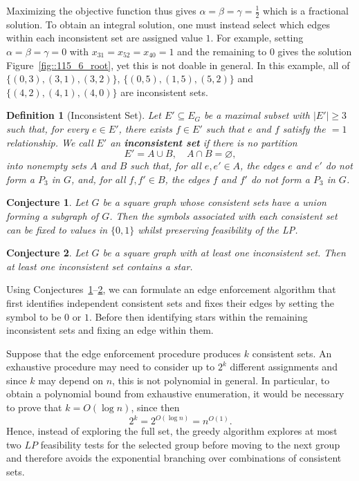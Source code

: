 \documentclass[11pt]{report}
\newtheorem{conjecture}{Conjecture}
\newtheorem{definition}{Definition}[section]
\begin{document}
Maximizing the objective function thus gives $\displaystyle \alpha=\beta=\gamma=\frac{1}{2}$ which is a fractional solution. To obtain an integral solution, one must instead select which edges within each inconsistent set are assigned value $1$. For example, setting $\alpha=\beta=\gamma=0$ with $x_{31}=x_{52}=x_{40} = 1$ and the remaining to $0$ gives the solution Figure~\ref{fig::115_6_root}, yet this is not doable in general. In this example, all of $\{(0,3), (3,1), (3,2) \}$, $\{(0,5), (1,5), (5,2)\}$ and $\{(4,2), (4,1), (4,0)\}$ are inconsistent sets. 

\begin{definition}[Inconsistent Set] \label{def::inconsistent_set}
  Let $E'\subseteq E_G$ be a maximal subset with $|E'|\geq 3$ such that, for every $e\in E'$, there exists $f\in E'$ such that $e$ and $f$ satisfy the $=1$ relationship. We call $E'$ an \textbf{inconsistent set} if there is no partition
  \[
  E'=A\cup B,\quad A\cap B=\varnothing,
  \]
  into nonempty sets $A$ and $B$ such that, for all $e,e'\in A$, the edges $e$ and $e'$ do not form a $P_3$ in $G$, and, for all $f,f'\in B$, the edges $f$ and $f'$ do not form a $P_3$ in $G$.
\end{definition}

\begin{conjecture} \label{conjecture::consistent_set_conjecture}
  Let $G$ be a square graph whose consistent sets have a union forming a subgraph of $G$. Then the symbols associated with each consistent set can be fixed to values in $\{0,1\}$ whilst preserving feasibility of the LP.
\end{conjecture}

\begin{conjecture} \label{conjecture::inconsistent_set_conjecture}
Let $G$ be a square graph with at least one inconsistent set. Then at least one inconsistent set contains a star.
\end{conjecture}

Using Conjectures~\ref{conjecture::consistent_set_conjecture}--\ref{conjecture::inconsistent_set_conjecture}, we can formulate an edge enforcement algorithm that first identifies independent consistent sets and fixes their edges by setting the symbol to be $0$ or $1$. Before then identifying stars within the remaining inconsistent sets and fixing an edge within them. 

Suppose that the edge enforcement procedure produces $k$ consistent sets. An exhaustive procedure may need to consider up to $2^k$ different assignments and since $k$ may depend on $n$, this is not polynomial in general. In particular, to obtain a polynomial bound from exhaustive enumeration, it would be necessary to prove that $
k=O(\log n)$, since then
\[
2^k=2^{O(\log n)}=n^{O(1)}.
\]
Hence, instead of exploring the full set, the greedy algorithm explores at most two $LP$ feasibility tests for the selected group before moving to the next group and therefore avoids the exponential branching over combinations of consistent sets. 
\end{document}
